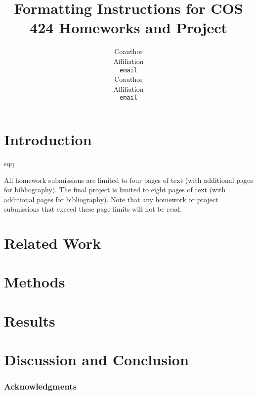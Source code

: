 \documentclass{article} %
\title{Formatting Instructions for COS 424 Homeworks and Project}
\author{
Coauthor\\
Affiliation\\
\texttt{email} \\
\And
Coauthor \\
Affiliation \\
\texttt{email} \\
}
\begin{document}
\maketitle

\begin{abstract}

\end{abstract}

\section{Introduction}sqq

All homework submissions are limited to four pages of text (with additional pages for bibliography). The final project is limited to eight pages of text (with additional pages for bibliography). Note that any homework or project submissions that exceed these page limits will not be read.

\section{Related Work}

\section{Methods}

\section{Results}

\section{Discussion and Conclusion}

\subsubsection*{Acknowledgments}



\end{document}
